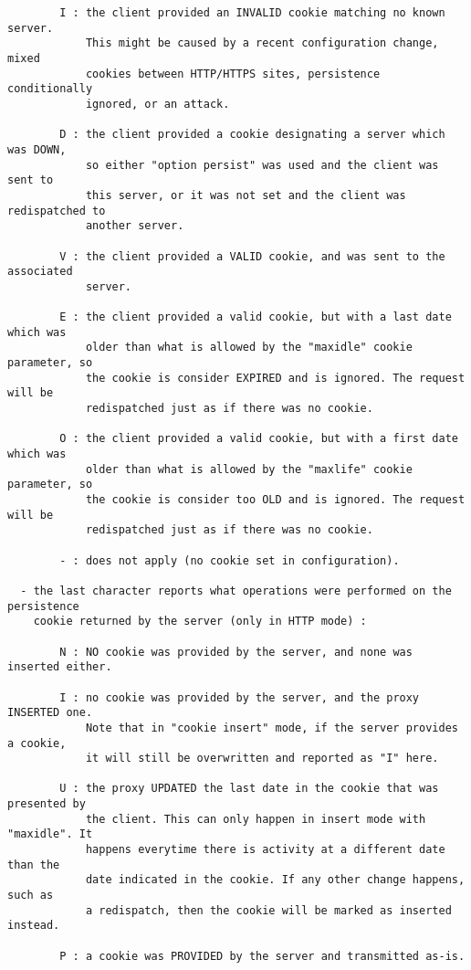 \begin{verbatim}
        I : the client provided an INVALID cookie matching no known server.
            This might be caused by a recent configuration change, mixed
            cookies between HTTP/HTTPS sites, persistence conditionally
            ignored, or an attack.

        D : the client provided a cookie designating a server which was DOWN,
            so either "option persist" was used and the client was sent to
            this server, or it was not set and the client was redispatched to
            another server.

        V : the client provided a VALID cookie, and was sent to the associated
            server.

        E : the client provided a valid cookie, but with a last date which was
            older than what is allowed by the "maxidle" cookie parameter, so
            the cookie is consider EXPIRED and is ignored. The request will be
            redispatched just as if there was no cookie.

        O : the client provided a valid cookie, but with a first date which was
            older than what is allowed by the "maxlife" cookie parameter, so
            the cookie is consider too OLD and is ignored. The request will be
            redispatched just as if there was no cookie.

        - : does not apply (no cookie set in configuration).

  - the last character reports what operations were performed on the persistence
    cookie returned by the server (only in HTTP mode) :

        N : NO cookie was provided by the server, and none was inserted either.

        I : no cookie was provided by the server, and the proxy INSERTED one.
            Note that in "cookie insert" mode, if the server provides a cookie,
            it will still be overwritten and reported as "I" here.

        U : the proxy UPDATED the last date in the cookie that was presented by
            the client. This can only happen in insert mode with "maxidle". It
            happens everytime there is activity at a different date than the
            date indicated in the cookie. If any other change happens, such as
            a redispatch, then the cookie will be marked as inserted instead.

        P : a cookie was PROVIDED by the server and transmitted as-is.


\end{verbatim}
